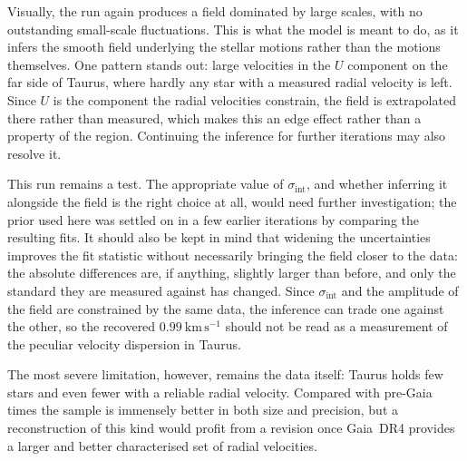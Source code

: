 Visually, the run again produces a field dominated by large scales, with no outstanding small-scale
fluctuations. This is what the model is meant to do, as it infers the smooth field underlying the stellar
motions rather than the motions themselves. One pattern stands out: large velocities in the $U$ component
on the far side of Taurus, where hardly any star with a measured radial velocity is left. Since $U$ is the
component the radial velocities constrain, the field is extrapolated there rather than measured, which
makes this an edge effect rather than a property of the region. Continuing the inference for further
iterations may also resolve it.

This run remains a test. The appropriate value of $\sigma_\mathrm{int}$, and whether inferring it alongside
the field is the right choice at all, would need further investigation; the prior used here was settled on
in a few earlier iterations by comparing the resulting fits. It should also be kept in mind that widening
the uncertainties improves the fit statistic without necessarily bringing the field closer to the data: the absolute
differences are, if anything, slightly larger than before, and only the standard they are measured against
has changed. Since
$\sigma_\mathrm{int}$ and the amplitude of the field are constrained by the same data, the inference can
trade one against the other, so the recovered $0.99~\mathrm{km\,s^{-1}}$ should not be read as a
measurement of the peculiar velocity dispersion in Taurus.

The most severe limitation, however, remains the data itself: Taurus holds few stars and even fewer with a
reliable radial velocity. Compared with pre-Gaia times the sample is immensely better in
both size and precision, but a reconstruction of this kind would profit from a revision once
Gaia~DR4 \citep{GaiaDR4}
provides a larger and better characterised set of radial velocities.